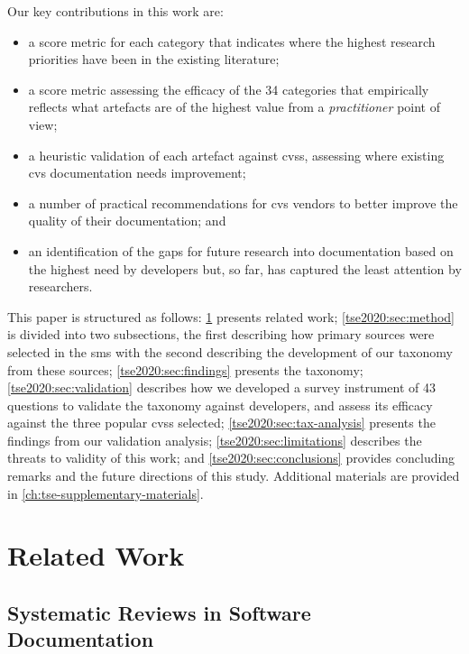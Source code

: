 Our key contributions in this work are:

\begin{itemize}
  \item a score metric for each category that indicates where the highest research priorities have been in the existing literature;
  \item a score metric assessing the efficacy of the 34 categories that empirically reflects what artefacts are of the highest value from a \textit{practitioner} point of view;
  \item a heuristic validation of each artefact against \glspl{cvs}, assessing where existing \gls{cvs}  documentation needs improvement;
  \item a number of practical recommendations for \gls{cvs} vendors to better improve the quality of their  documentation; and
  \item an identification of the gaps for future research into  documentation based on the highest need by developers but, so far, has captured the least attention by researchers.

\end{itemize}
This paper is structured as follows: \cref{tse2020:sec:related-work} presents related work; \cref{tse2020:sec:method} is divided into two subsections, the first describing how primary sources were selected in the \gls{sms} with the second describing the development of our taxonomy from these sources; \cref{tse2020:sec:findings} presents the taxonomy; \cref{tse2020:sec:validation} describes how we developed a survey instrument of 43 questions to validate the taxonomy against developers, and assess its efficacy against the three popular \glspl{cvs} selected; \cref{tse2020:sec:tax-analysis} presents the findings from our validation analysis; \cref{tse2020:sec:limitations} describes the threats to validity of this work; and \cref{tse2020:sec:conclusions} provides concluding remarks and the future directions of this study. Additional materials are provided in \cref{ch:tse-supplementary-materials}.

\section{Related Work}
\label{tse2020:sec:related-work}

\subsection{Systematic Reviews in Software Documentation}

